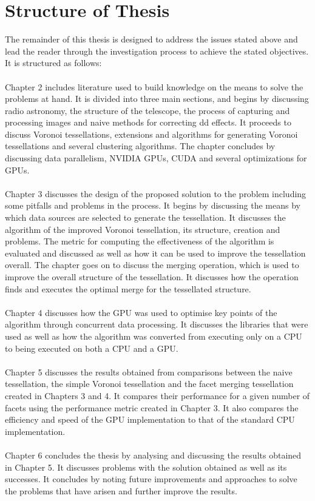 \section{Structure of Thesis}
The remainder of this thesis is designed to address the issues stated above and lead the reader through the investigation process to achieve the stated objectives. It is structured as follows:
\\
\\
Chapter 2 includes literature used to build knowledge on the means to solve the problems at hand. It is divided into three main sections, and begins by discussing radio astronomy, the structure of the telescope, the process of capturing and processing images and naive methods for correcting \gls{dd} effects. It proceeds to discuss Voronoi tessellations, extensions and algorithms for generating Voronoi tessellations and several clustering algorithms. The chapter concludes by discussing data parallelism, NVIDIA GPUs, CUDA and several optimizations for GPUs.
\\
\\
Chapter 3 discusses the design of the proposed solution to the problem including some pitfalls and problems in the process. It begins by discussing the means by which data sources are selected to generate the tessellation. It discusses the algorithm of the improved Voronoi tessellation, its structure, creation and problems. The metric for computing the effectiveness of the algorithm is evaluated and discussed as well as how it can be used to improve the tessellation overall. The chapter goes on to discuss the merging operation, which is used to improve the overall structure of the tessellation. It discusses how the operation finds and executes the optimal merge for the tessellated structure.
\\
\\
Chapter 4 discusses how the GPU was used to optimise key points of the algorithm through concurrent data processing. It discusses the libraries that were used as well as how the algorithm was converted from executing only on a CPU to being executed on both a CPU and a GPU.
\\
\\
Chapter 5 discusses the results obtained from comparisons between the naive tessellation, the simple Voronoi tessellation and the facet merging tessellation created in Chapters 3 and 4. It compares their performance for a given number of facets using the performance metric created in Chapter 3. It also compares the efficiency and speed of the GPU implementation to that of the standard CPU implementation.
\\
\\
Chapter 6 concludes the thesis by analysing and discussing the results obtained in Chapter 5. It discusses problems with the solution obtained as well as its successes. It concludes by noting future improvements and approaches to solve the problems that have arisen and further improve the results.
